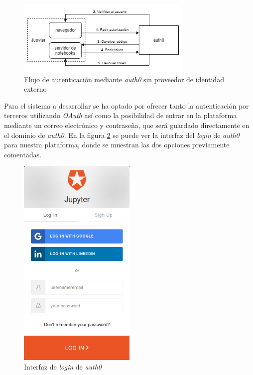 \documentclass[11pt,spanish,listoffigures]{tfgetsinf}
\begin{document}
\begin{figure}[h]
	\centering
  	\includegraphics[width=0.75\textwidth]{auth0-flow2.png}
  	\caption{Flujo de autenticación mediante \textit{auth0} sin proveedor de identidad externo}
  	\label{fig:auth0-scheme-2}
\end{figure}

Para el sistema a desarrollar se ha optado por ofrecer tanto la autenticación por terceros utilizando \textit{OAuth} así como la posibilidad de entrar en la plataforma mediante un correo electrónico y contraseña, que será guardado directamente en el dominio de \textit{auth0}. En la figura \ref{fig:login} se puede ver la interfaz del \textit{login} de \textit{auth0} para nuestra plataforma, donde se muestran las dos opciones previamente comentadas.

\begin{figure}[H]
	\centering
  	\includegraphics[width=0.5\textwidth]{login.png}
  	\caption{Interfaz de \textit{login} de \textit{auth0}}
  	\label{fig:login}
\end{figure}
\end{document}
